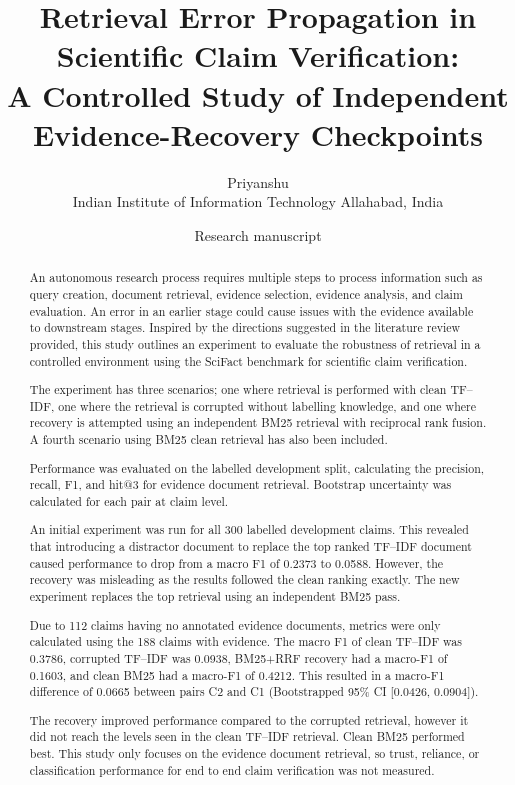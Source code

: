 \documentclass[11pt,a4paper]{article}
\title{\textbf{Retrieval Error Propagation in Scientific Claim Verification:}\\
A Controlled Study of Independent Evidence-Recovery Checkpoints}
\author{Priyanshu\\
Indian Institute of Information Technology Allahabad, India}
\date{Research manuscript}
\begin{document}
\maketitle

\begin{abstract}
An autonomous research process requires multiple steps to process information such as query creation, document retrieval, evidence selection, evidence analysis, and claim evaluation. An error in an earlier stage could cause issues with the evidence available to downstream stages. Inspired by the directions suggested in the literature review provided, this study outlines an experiment to evaluate the robustness of retrieval in a controlled environment using the SciFact benchmark for scientific claim verification.

The experiment has three scenarios; one where retrieval is performed with clean TF--IDF, one where the retrieval is corrupted without labelling knowledge, and one where recovery is attempted using an independent BM25 retrieval with reciprocal rank fusion. A fourth scenario using BM25 clean retrieval has also been included.

Performance was evaluated on the labelled development split, calculating the precision, recall, F1, and hit@3 for evidence document retrieval. Bootstrap uncertainty was calculated for each pair at claim level.

An initial experiment was run for all 300 labelled development claims. This revealed that introducing a distractor document to replace the top ranked TF--IDF document caused performance to drop from a macro F1 of 0.2373 to 0.0588. However, the recovery was misleading as the results followed the clean ranking exactly. The new experiment replaces the top retrieval using an independent BM25 pass.

Due to 112 claims having no annotated evidence documents, metrics were only calculated using the 188 claims with evidence. The macro F1 of clean TF--IDF was 0.3786, corrupted TF--IDF was 0.0938, BM25+RRF recovery had a macro-F1 of 0.1603, and clean BM25 had a macro-F1 of 0.4212. This resulted in a macro-F1 difference of 0.0665 between pairs C2 and C1 (Bootstrapped 95\% CI [0.0426, 0.0904]).

The recovery improved performance compared to the corrupted retrieval, however it did not reach the levels seen in the clean TF--IDF retrieval. Clean BM25 performed best. This study only focuses on the evidence document retrieval, so trust, reliance, or classification performance for end to end claim verification was not measured.
\end{abstract}
\end{document}
